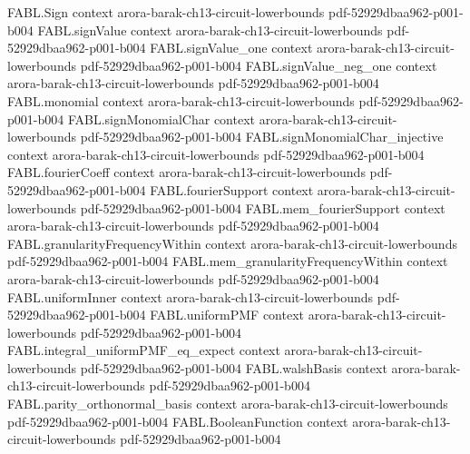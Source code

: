\begin{theorem}
\label{FABL.EncodedGraphContainsClique.mono}
\leanok
{}
\proofstep
  {FABL.Sign}
  {context}
  {arora-barak-ch13-circuit-lowerbounds}
  {pdf-52929dbaa962-p001-b004}
\proofstep
  {FABL.signValue}
  {context}
  {arora-barak-ch13-circuit-lowerbounds}
  {pdf-52929dbaa962-p001-b004}
\proofstep
  {FABL.signValue_one}
  {context}
  {arora-barak-ch13-circuit-lowerbounds}
  {pdf-52929dbaa962-p001-b004}
\proofstep
  {FABL.signValue_neg_one}
  {context}
  {arora-barak-ch13-circuit-lowerbounds}
  {pdf-52929dbaa962-p001-b004}
\proofstep
  {FABL.monomial}
  {context}
  {arora-barak-ch13-circuit-lowerbounds}
  {pdf-52929dbaa962-p001-b004}
\proofstep
  {FABL.signMonomialChar}
  {context}
  {arora-barak-ch13-circuit-lowerbounds}
  {pdf-52929dbaa962-p001-b004}
\proofstep
  {FABL.signMonomialChar_injective}
  {context}
  {arora-barak-ch13-circuit-lowerbounds}
  {pdf-52929dbaa962-p001-b004}
\proofstep
  {FABL.fourierCoeff}
  {context}
  {arora-barak-ch13-circuit-lowerbounds}
  {pdf-52929dbaa962-p001-b004}
\proofstep
  {FABL.fourierSupport}
  {context}
  {arora-barak-ch13-circuit-lowerbounds}
  {pdf-52929dbaa962-p001-b004}
\proofstep
  {FABL.mem_fourierSupport}
  {context}
  {arora-barak-ch13-circuit-lowerbounds}
  {pdf-52929dbaa962-p001-b004}
\proofstep
  {FABL.granularityFrequencyWithin}
  {context}
  {arora-barak-ch13-circuit-lowerbounds}
  {pdf-52929dbaa962-p001-b004}
\proofstep
  {FABL.mem_granularityFrequencyWithin}
  {context}
  {arora-barak-ch13-circuit-lowerbounds}
  {pdf-52929dbaa962-p001-b004}
\proofstep
  {FABL.uniformInner}
  {context}
  {arora-barak-ch13-circuit-lowerbounds}
  {pdf-52929dbaa962-p001-b004}
\proofstep
  {FABL.uniformPMF}
  {context}
  {arora-barak-ch13-circuit-lowerbounds}
  {pdf-52929dbaa962-p001-b004}
\proofstep
  {FABL.integral_uniformPMF_eq_expect}
  {context}
  {arora-barak-ch13-circuit-lowerbounds}
  {pdf-52929dbaa962-p001-b004}
\proofstep
  {FABL.walshBasis}
  {context}
  {arora-barak-ch13-circuit-lowerbounds}
  {pdf-52929dbaa962-p001-b004}
\proofstep
  {FABL.parity_orthonormal_basis}
  {context}
  {arora-barak-ch13-circuit-lowerbounds}
  {pdf-52929dbaa962-p001-b004}
\proofstep
  {FABL.BooleanFunction}
  {context}
  {arora-barak-ch13-circuit-lowerbounds}
  {pdf-52929dbaa962-p001-b004}

\end{theorem}
